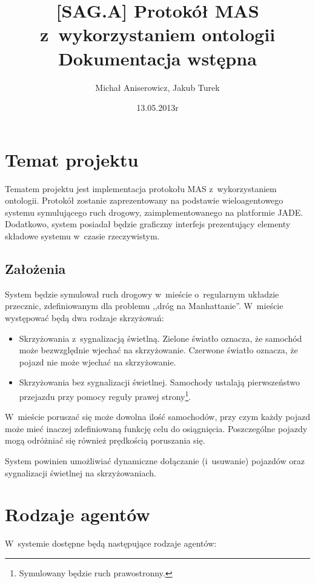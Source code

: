 \documentclass[11pt,a4paper]{article}
\title{[SAG.A] Protokół MAS z~wykorzystaniem ontologii \\ Dokumentacja wstępna}
\author{Michał Aniserowicz, Jakub Turek}
\date{13.05.2013r}
\begin{document}
\maketitle

\section{Temat projektu}

Tematem projektu jest implementacja protokołu MAS z~wykorzystaniem ontologii. Protokół zostanie zaprezentowany na podstawie wieloagentowego systemu symulującego ruch drogowy, zaimplementowanego na platformie JADE. Dodatkowo, system posiadał będzie graficzny interfejs prezentujący elementy składowe systemu w~czasie rzeczywistym.

\subsection{Założenia}

System będzie symulował ruch drogowy w~mieście o~regularnym układzie przecznic, zdefiniowanym dla problemu ,,dróg na Manhattanie''. W~mieście występować będą dwa rodzaje skrzyżowań:

\begin{itemize}
    \item Skrzyżowania z~sygnalizacją świetlną. Zielone światło oznacza, że samochód może bezwzględnie wjechać na skrzyżowanie. Czerwone światło oznacza, że pojazd nie może wjechać na skrzyżowanie.
    \item Skrzyżowania bez sygnalizacji świetlnej. Samochody ustalają pierwszeństwo przejazdu przy pomocy reguły prawej strony\footnote{Symulowany będzie ruch prawostronny.}.
\end{itemize}

W~mieście poruszać się może dowolna ilość samochodów, przy czym każdy pojazd może mieć inaczej zdefiniowaną funkcję celu do osiągnięcia. Poszczególne pojazdy mogą odróżniać się również prędkością poruszania się.

System powinien umożliwiać dynamiczne dołączanie (i~usuwanie) pojazdów oraz sygnalizacji świetlnej na skrzyżowaniach.

\section{Rodzaje agentów}

W~systemie dostępne będą następujące rodzaje agentów:
\end{document}
